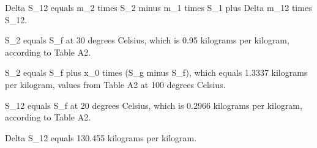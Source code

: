 Delta S_12 equals m_2 times S_2 minus m_1 times S_1 plus Delta m_12 times S_12.

S_2 equals S_f at 30 degrees Celsius, which is 0.95 kilograms per kilogram, according to Table A2.

S_2 equals S_f plus x_0 times (S_g minus S_f), which equals 1.3337 kilograms per kilogram, values from Table A2 at 100 degrees Celsius.

S_12 equals S_f at 20 degrees Celsius, which is 0.2966 kilograms per kilogram, according to Table A2.

Delta S_12 equals 130.455 kilograms per kilogram.